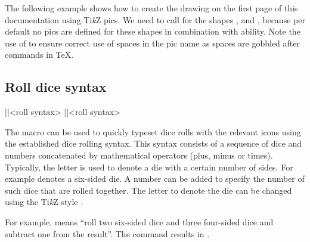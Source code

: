 \documentclass[a4paper]{article}
\begin{document}
The following example shows how to create the drawing on the first page of this documentation using Ti\emph{k}Z pics. We need to call  for the shapes ,  and , because per default no pics are defined for these shapes in combination with ability. Note the use of \macro{\space} to ensure correct use of spaces in the pic name as spaces are gobbled after commands in TeX.

\begin{codeexample}

\end{codeexample}

\subsection{Roll dice syntax}

\begin{macrodef}
|\roll|{<roll syntax>}
|\rpgiconsroll|{<roll syntax>}
\end{macrodef}
The \macro{\roll} macro can be used to quickly typeset dice rolls with the relevant icons using the established dice rolling syntax. This syntax consists of a sequence of dice and numbers concatenated by mathematical operators (plus, minus or times). Typically, the letter  is used to denote a die with a certain number of sides. For example  denotes a six-sided die. A number can be added to specify the number of such dice that are rolled together. The letter to denote the die can be changed using the Ti\emph{k}Z style . 

For example,  means ``roll two six-sided dice and three four-sided dice and subtract one from the result''. The command  results in .
\end{document}
